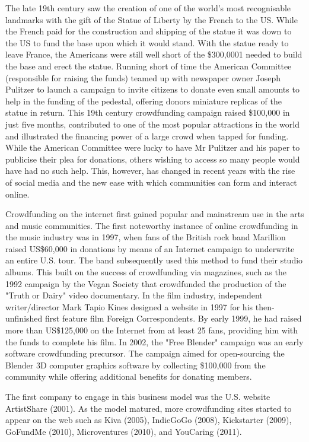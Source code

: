 The late 19th century saw the creation of one of the world’s most recognisable landmarks
with the gift of the Statue of Liberty by the French to the US. While the French paid for the
construction and shipping of the statue it was down to the US to fund the base upon which it
would stand. With the statue ready to leave France, the Americans were still well short of the
\$300,0001
needed to build the base and erect the statue. Running short of time the American
Committee (responsible for raising the funds) teamed up with newspaper owner Joseph
Pulitzer to launch a campaign to invite citizens to donate even small amounts to help in the
funding of the pedestal, offering donors miniature replicas of the statue in return. This 19th
century crowdfunding campaign raised \$100,000 in just five months, contributed to one of
the most popular attractions in the world and illustrated the financing power of a large crowd
when tapped for funding.
While the American Committee were lucky to have Mr Pulitzer and his paper to publicise their
plea for donations, others wishing to access so many people would have had no such help.
This, however, has changed in recent years with the rise of social media and the new ease with
which communities can form and interact online.

Crowdfunding on the internet first gained popular and mainstream use in the arts and music communities.
The first noteworthy instance of online crowdfunding in the music industry was in 1997, when fans of the British rock band Marillion raised US\$60,000 in donations by means of an Internet campaign to underwrite an entire U.S. tour. The band subsequently used this method to fund their studio albums.
This built on the success of crowdfunding via magazines, such as the 1992 campaign by the Vegan Society that crowdfunded the production of the "Truth or Dairy" video documentary.
In the film industry, independent writer/director Mark Tapio Kines designed a website in 1997 for his then-unfinished first feature film Foreign Correspondents. By early 1999, he had raised more than US\$125,000 on the Internet from at least 25 fans, providing him with the funds to complete his film.
In 2002, the "Free Blender" campaign was an early software crowdfunding precursor.
The campaign aimed for open-sourcing the Blender 3D computer graphics software by collecting \$100,000 from the community while offering additional benefits for donating members.

The first company to engage in this business model was the U.S. website ArtistShare (2001).
As the model matured, more crowdfunding sites started to appear on the web such as Kiva (2005), IndieGoGo (2008), Kickstarter (2009), GoFundMe (2010), Microventures (2010), and YouCaring (2011).

